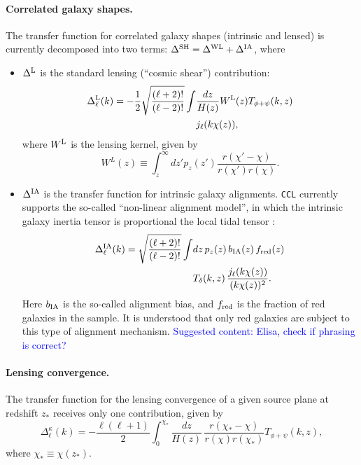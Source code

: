 \documentclass[\docopts]{\docclass}
\newcommand{\cont}[1]{\textcolor{blue}{Suggested content: #1}}
\newcommand{\ccl}{{\tt CCL}\xspace}
\begin{document}
\paragraph{\bf Correlated galaxy shapes.} The transfer function for correlated galaxy shapes (intrinsic and lensed) is currently decomposed into two terms: $\Delta^{\rm SH}=\Delta^{\rm WL}+\Delta^{\rm IA}$, where
\begin{itemize}
  \item $\Delta^{\rm L}$ is the standard lensing (``cosmic shear'') contribution:
    \begin{align} \label{eq:transfer_lensing}
      \nonumber
      \Delta_\ell^{\rm L}(k)=-\frac{1}{2}\sqrt{\frac{(\ell+2)!}{(\ell-2)!}}\int &\frac{dz}{H(z)} W^{\rm L}(z)T_{\phi+\psi}(k,z)\\
      &j_\ell(k\chi(z)),
    \end{align}
    where $W^{\rm L}$ is the lensing kernel, given by
    \begin{equation}
      W^L(z)\equiv\int_z^\infty dz' p_z(z')\frac{r(\chi'-\chi)}{r(\chi')r(\chi)}.
    \end{equation}
  \item $\Delta^{\rm IA}$ is the transfer function for intrinsic galaxy alignments. \ccl currently supports the so-called ``non-linear alignment model'', in which the intrinsic galaxy inertia tensor is proportional the local tidal tensor \cite{2004PhRvD..70f3526H,2007MNRAS.381.1197H}:
    \begin{align}\nonumber
      \Delta_\ell^{\rm IA}(k)=\sqrt{\frac{(\ell+2)!}{(\ell-2)!}}\int &dz\,p_z(z)\,b_{\rm IA}(z)\,f_{\rm red}(z)\\
      &T_\delta(k,z)\,\frac{j_\ell(k\chi(z))}{(k\chi(z))^2}.
    \end{align}
    Here $b_{\rm IA}$ is the so-called alignment bias, and $f_{\rm red}$ is the fraction of red galaxies in the sample. It is understood that only red galaxies are subject to this type of alignment mechanism. \cont{Elisa, check if phrasing is correct?}
\end{itemize}

\paragraph{\bf Lensing convergence.} The transfer function for the lensing convergence of a given source plane at redshift $z_*$ receives only one contribution, given by
\begin{equation}
  \Delta_\ell^\kappa(k)=-\frac{\ell(\ell+1)}{2}\int_0^{\chi_*}\frac{dz}{H(z)}\,\frac{r(\chi_*-\chi)}{r(\chi)r(\chi_*)}T_{\phi+\psi}(k,z),
\end{equation}
where $\chi_*\equiv\chi(z_*)$.
\end{document}
